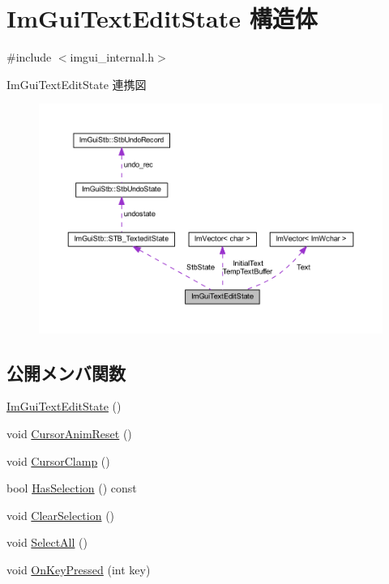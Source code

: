 \hypertarget{struct_im_gui_text_edit_state}{}\section{Im\+Gui\+Text\+Edit\+State 構造体}
\label{struct_im_gui_text_edit_state}


{\ttfamily \#include $<$imgui\+\_\+internal.\+h$>$}



Im\+Gui\+Text\+Edit\+State 連携図\nopagebreak
\begin{figure}[H]
\begin{center}
\leavevmode
\includegraphics[width=350pt]{struct_im_gui_text_edit_state__coll__graph}
\end{center}
\end{figure}
\subsection*{公開メンバ関数}
\begin{DoxyCompactItemize}
\item 
\mbox{\hyperlink{struct_im_gui_text_edit_state_a475df87b81e95f80fa7bda77ca47d9fc}{Im\+Gui\+Text\+Edit\+State}} ()
\item 
void \mbox{\hyperlink{struct_im_gui_text_edit_state_abed49497339d5242f42d86193a2c683e}{Cursor\+Anim\+Reset}} ()
\item 
void \mbox{\hyperlink{struct_im_gui_text_edit_state_ac6f8184c63c826dfc9bc2a47ba57b80c}{Cursor\+Clamp}} ()
\item 
bool \mbox{\hyperlink{struct_im_gui_text_edit_state_a46735493114451380c2d3684b528d124}{Has\+Selection}} () const
\item 
void \mbox{\hyperlink{struct_im_gui_text_edit_state_ae753eb90c3bb7954dfc1e7fd0fef4460}{Clear\+Selection}} ()
\item 
void \mbox{\hyperlink{struct_im_gui_text_edit_state_ab6f494f3335bf7911b83cfc15edd612e}{Select\+All}} ()
\item 
void \mbox{\hyperlink{struct_im_gui_text_edit_state_a30a1d78690ef2bbb9d4b8f75385b8c26}{On\+Key\+Pressed}} (int key)
\end{DoxyCompactItemize}
